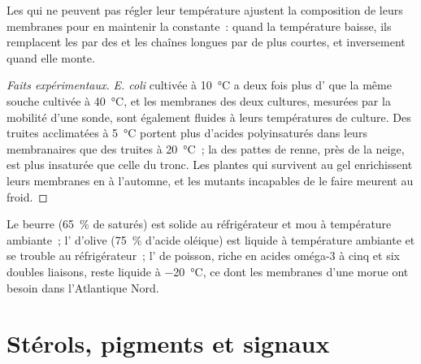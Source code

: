 \begin{proposition}\label{prop:b1:lipids:homeoviscous}
Les  qui ne peuvent pas régler leur température ajustent la
composition de leurs membranes pour en maintenir la 
constante~: quand la température baisse, ils remplacent les  par des  et les chaînes longues par de plus courtes, et
inversement quand elle monte.
\end{proposition}
\begin{proof}[Faits expérimentaux]
\emph{E. coli} cultivée à \qty{10}{\celsius} a deux fois plus d' que la même souche cultivée à \qty{40}{\celsius}, et les
membranes des deux cultures, mesurées par la mobilité d'une sonde, sont
également fluides à leurs températures de culture. Des truites
acclimatées à \qty{5}{\celsius} portent plus d'acides polyinsaturés dans
leurs  membranaires que des truites à \qty{20}{\celsius}~; la
 des pattes de renne, près de la neige, est plus insaturée que
celle du tronc. Les plantes qui survivent au gel enrichissent leurs
membranes en   à l'automne, et les mutants incapables de
le faire meurent au froid.
\end{proof}

\begin{example}\label{ex:b1:lipids:kitchen}
Le beurre (\qty{65}{\%} de saturés) est solide au réfrigérateur et mou à
température ambiante~; l' d'olive (\qty{75}{\%} d'acide oléique)
est liquide à température ambiante et se trouble au réfrigérateur~;
l' de poisson, riche en acides oméga-3 à cinq et six doubles
liaisons, reste liquide à \qty{-20}{\celsius}, ce dont les membranes
d'une morue ont besoin dans l'Atlantique Nord.
\end{example}

\section{Stérols, pigments et signaux}

